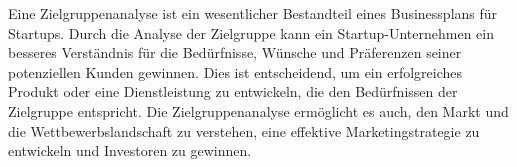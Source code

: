 \begin{refsection}
  
  
  Eine Zielgruppenanalyse ist ein wesentlicher Bestandteil eines Businessplans für Startups. Durch die Analyse der Zielgruppe kann ein Startup-Unternehmen ein besseres Verständnis für die Bedürfnisse, Wünsche und Präferenzen seiner potenziellen Kunden gewinnen. Dies ist entscheidend, um ein erfolgreiches Produkt oder eine Dienstleistung zu entwickeln, die den Bedürfnissen der Zielgruppe entspricht. Die Zielgruppenanalyse ermöglicht es auch, den Markt und die Wettbewerbslandschaft zu verstehen, eine effektive Marketingstrategie zu entwickeln und Investoren zu gewinnen.

  \clearpage
  \printbibliography[heading=subsubbibliography]
\end{refsection}
\clearpage
